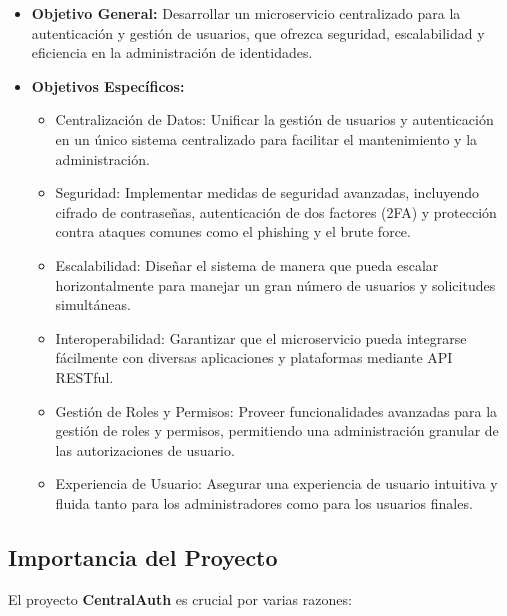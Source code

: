 \documentclass{article}
\begin{document}
\begin{itemize}
    \item \textbf{Objetivo General:} Desarrollar un microservicio centralizado para la autenticación y gestión de usuarios, que ofrezca seguridad, escalabilidad y eficiencia en la administración de identidades.
    \item \textbf{Objetivos Específicos:}
          \begin{itemize}
              \item Centralización de Datos: Unificar la gestión de usuarios y autenticación en un único sistema centralizado para facilitar el mantenimiento y la administración.
              \item Seguridad: Implementar medidas de seguridad avanzadas, incluyendo cifrado de contraseñas, autenticación de dos factores (2FA) y protección contra ataques comunes como el phishing y el brute force.
              \item Escalabilidad: Diseñar el sistema de manera que pueda escalar horizontalmente para manejar un gran número de usuarios y solicitudes simultáneas.
              \item Interoperabilidad: Garantizar que el microservicio pueda integrarse fácilmente con diversas aplicaciones y plataformas mediante API RESTful.
              \item Gestión de Roles y Permisos: Proveer funcionalidades avanzadas para la gestión de roles y permisos, permitiendo una administración granular de las autorizaciones de usuario.
              \item Experiencia de Usuario: Asegurar una experiencia de usuario intuitiva y fluida tanto para los administradores como para los usuarios finales.
          \end{itemize}
\end{itemize}

\subsection{Importancia del Proyecto}

El proyecto \textbf{CentralAuth} es crucial por varias razones:
\end{document}
